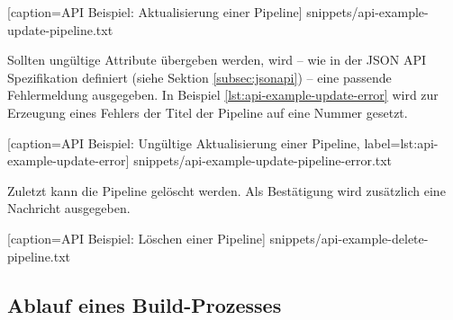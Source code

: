 
  [caption={API Beispiel: Aktualisierung einer Pipeline}]
  {snippets/api-example-update-pipeline.txt}

Sollten ungültige Attribute übergeben werden, wird – wie in der JSON API Spezifikation definiert (siehe Sektion \ref{subsec:jsonapi}) – eine passende Fehlermeldung ausgegeben. In Beispiel \ref{lst:api-example-update-error} wird zur Erzeugung eines Fehlers der Titel der Pipeline auf eine Nummer gesetzt.


  [caption={API Beispiel: Ungültige Aktualisierung einer Pipeline},
  label={lst:api-example-update-error}]
  {snippets/api-example-update-pipeline-error.txt}

Zuletzt kann die Pipeline gelöscht werden. Als Bestätigung wird zusätzlich eine Nachricht ausgegeben.


  [caption={API Beispiel: Löschen einer Pipeline}]
  {snippets/api-example-delete-pipeline.txt}

\subsection{Ablauf eines Build-Prozesses}
